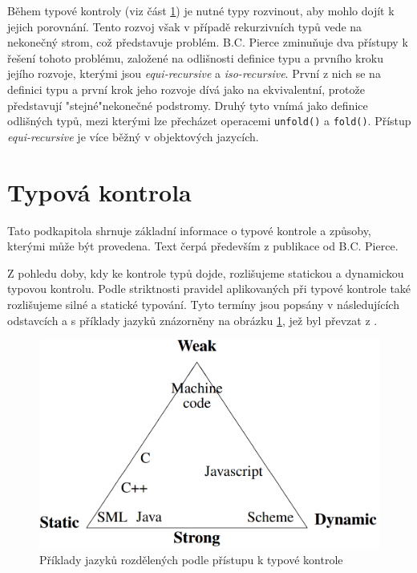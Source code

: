 \documentclass[czech,DP]{thesiskiv}
\begin{document}
Během typové kontroly (viz část \ref{sec:typecheck}) je nutné typy rozvinout, aby mohlo dojít k jejich porovnání. Tento rozvoj však v případě rekurzivních typů vede na nekonečný strom, což představuje problém. B.C. Pierce zminuňuje \cite{pierce2002} dva přístupy k řešení tohoto problému, založené na odlišnosti definice typu a prvního kroku jejího rozvoje, kterými jsou \textit{equi-recursive} a \textit{iso-recursive}. První z nich se na definici typu a první krok jeho rozvoje dívá jako na ekvivalentní, protože představují "stejné"\space  nekonečné podstromy. Druhý tyto vnímá jako definice odlišných typů, mezi kterými lze přecházet operacemi \verb|unfold()| a \verb|fold()|. Přístup \textit{equi-recursive} je více běžný v objektových jazycích.


\section{Typová kontrola}
\label{sec:typecheck}

Tato podkapitola shrnuje základní informace o typové kontrole a způsoby, kterými může být provedena. Text čerpá především z publikace  \cite{pierce2002} od B.C. Pierce.

Z pohledu doby, kdy ke kontrole typů dojde, rozlišujeme statickou a dynamickou typovou kontrolu. Podle striktnosti pravidel aplikovaných při typové kontrole také rozlišujeme silné a statické typování. Tyto termíny jsou popsány v následujících odstavcích a s příklady jazyků znázorněny na obrázku \ref{fig:typying-examples}, jež byl převzat z \cite{mogensen2010}.

\begin{figure} [h]
	\centering
	\includegraphics[width=\linewidth]{typing-examples}
	\caption{Příklady jazyků rozdělených podle přístupu k typové kontrole}
	\label{fig:typying-examples}
\end{figure}
\end{document}
